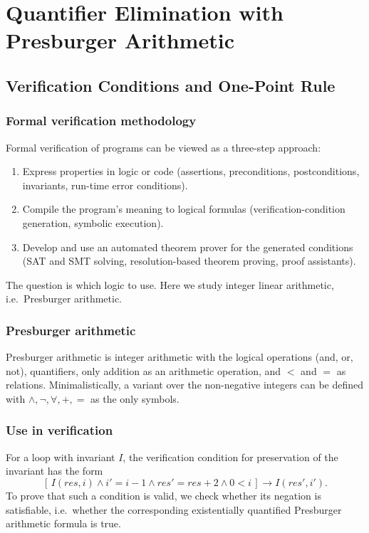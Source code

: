 % 
\chapter{Quantifier Elimination with Presburger Arithmetic}
 
\section{Verification Conditions and One-Point Rule}
 
\subsection*{Formal verification methodology}
 
Formal verification of programs can be viewed as a three-step approach:
\begin{enumerate}
  \item Express properties in logic or code (assertions, preconditions, postconditions, invariants, run-time error conditions).
  \item Compile the program's meaning to logical formulas (verification-condition generation, symbolic execution).
  \item Develop and use an automated theorem prover for the generated conditions (SAT and SMT solving, resolution-based theorem proving, proof assistants).
\end{enumerate}
The question is which logic to use. Here we study integer linear arithmetic, i.e.\ Presburger arithmetic.
 
\subsection*{Presburger arithmetic}
 
Presburger arithmetic is integer arithmetic with the logical operations (and, or, not), quantifiers, only addition as an arithmetic operation, and $<$ and $=$ as relations. Minimalistically, a variant over the non-negative integers can be defined with $\wedge, \neg, \forall, +, =$ as the only symbols.
  
\subsection*{Use in verification}
 
For a loop with invariant $I$, the verification condition for preservation of the invariant has the form
\[
[\,I(\mathit{res}, i) \wedge i' = i - 1 \wedge \mathit{res}' = \mathit{res} + 2 \wedge 0 < i\,] \rightarrow I(\mathit{res}', i').
\]
To prove that such a condition is valid, we check whether its negation is satisfiable, i.e.\ whether the corresponding existentially quantified Presburger arithmetic formula is true.
 
